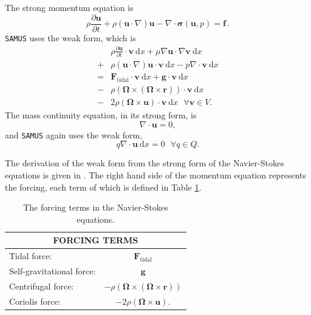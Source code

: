 \documentclass[twocolumn,doublespacing]{aastex631}
\begin{document}
The strong momentum equation is 
\begin{equation}
    \rho\frac{\partial\boldsymbol{u}}{\partial t}+\rho(\boldsymbol{u}\cdot\nabla)\boldsymbol{u}-\nabla\cdot\boldsymbol{\sigma}(\boldsymbol{u},p)=\boldsymbol{f}\,.
\end{equation}
\texttt{SAMUS} uses the weak form, which is
\begin{equation}\label{eq:momentum}
\begin{aligned}
    &\rho\frac{\partial\boldsymbol{u}}{\partial t}\cdot\boldsymbol{v}\ \text{d}x + \mu \nabla\boldsymbol{u}\cdot\nabla\boldsymbol{v}\ \text{d}x\\
    +&\rho(\boldsymbol{u}\cdot\nabla)\boldsymbol{u}\cdot\boldsymbol{v}\ \text{d}x-p\nabla\cdot\boldsymbol{v}\ \text{d}x\\
    =&\boldsymbol{F}_{\text{tidal}}\cdot\boldsymbol{v}\ \text{d}x+\boldsymbol{g}\cdot\boldsymbol{v}\ \text{d}x\\
    -&\rho (\boldsymbol{\Omega}\times(\boldsymbol{\Omega}\times\boldsymbol{r}))\cdot\boldsymbol{v}\ \text{d}x\\
    -&2\rho(\boldsymbol{\Omega}\times\boldsymbol{u})\cdot\boldsymbol{v}\ \text{d}x\ \ \ \forall\boldsymbol{v}\in V.
\end{aligned}
\end{equation}
The mass continuity equation, in its strong form, is
\begin{equation}
    \nabla\cdot\boldsymbol{u}=0,
\end{equation}
and \texttt{SAMUS} again uses the weak form,
\begin{equation}\label{eq:masscont}
    q\nabla\cdot\boldsymbol{u}\ \text{d}x=0\ \ \ \forall q\in Q.
\end{equation}

The derivation of the weak form from the strong form of the Navier-Stokes equations is given in \citet{quarteroni2014}. The right hand side of the momentum equation represents the forcing, each term of which is defined in Table \ref{table:forcing}.
 
\begin{table}[ht]
\begin{tabular}{ |l|c| } 
 \hline
 \multicolumn{2}{||c||}{FORCING TERMS} \\
 \hline\hline
 Tidal force:&$\boldsymbol{F}_{\text{tidal}} $\\ 
 \hline
 Self-gravitational force:&$\boldsymbol{g} $\\
 \hline
 Centrifugal force:&$-\rho(\boldsymbol{\Omega}\times(\boldsymbol{\Omega}\times\boldsymbol{r}))$\\
 \hline
 Coriolis force:&$-2\rho(\boldsymbol{\Omega}\times\boldsymbol{u})$.\\
 \hline
\end{tabular}

\caption{The forcing terms in the Navier-Stokes equations.}

\label{table:forcing}
\end{table}
 
\end{document}
